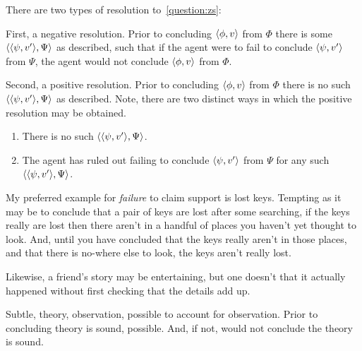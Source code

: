 \begin{note}
  There are two types of resolution to~\autoref{question:zs}:

  First, a negative resolution.
  Prior to concluding \(\langle \phi, v \rangle\) from \(\Phi\) there is some \(\langle \langle \psi, v' \rangle, \Psi \rangle\) as described, such that if the agent were to fail to conclude \(\langle \psi, v' \rangle\) from \(\Psi\), the agent would not conclude \(\langle \phi, v \rangle\) from \(\Phi\).

  Second, a positive resolution.
  Prior to concluding \(\langle \phi, v \rangle\) from \(\Phi\) there is no such \(\langle \langle \psi, v' \rangle, \Psi \rangle\) as described.
  Note, there are two distinct ways in which the positive resolution may be obtained.
  \begin{enumerate}
  \item
    There is no such \(\langle \langle \psi, v' \rangle, \Psi \rangle\).
  \item
    The agent has ruled out failing to conclude \(\langle \psi, v' \rangle\) from \(\Psi\) for any such \(\langle \langle \psi, v' \rangle, \Psi \rangle\).
  \end{enumerate}
\end{note}

\begin{note}
  My preferred example for \emph{failure} to claim support is lost keys.
  Tempting as it may be to conclude that a pair of keys are lost after some searching, if the keys really are lost then there aren't in a handful of places you haven't yet thought to look.
  And, until you have concluded that the keys really aren't in those places, and that there is no-where else to look, the keys aren't really lost.

  Likewise, a friend's story may be entertaining, but one doesn't \csN{} that it actually happened without first checking that the details add up.

  Subtle, theory, observation, possible to account for observation.
  Prior to concluding theory is sound, possible.
  And, if not, would not conclude the theory is sound.
\end{note}

